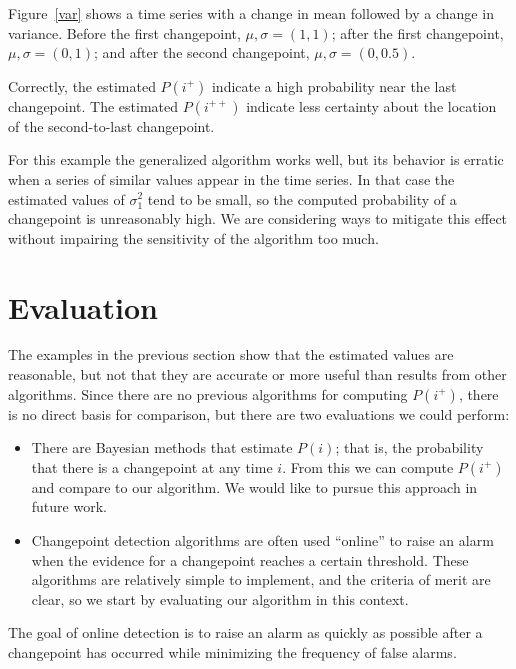 \documentclass[twocolumn,11pt]{article}
\begin{document}
Figure~\ref{var} shows a time series with a change in mean
followed by a change in variance.  Before the first changepoint, $\mu,
\sigma = (1, 1)$; after the first changepoint, $\mu, \sigma = (0, 1)$; and
after the second changepoint, $\mu, \sigma = (0, 0.5)$.

Correctly, the estimated $P(i^+)$ indicate a high probability
near the last changepoint.  The estimated $P(i^{++})$ indicate less
certainty about the location of the second-to-last changepoint.

For this example the generalized algorithm works well, but its
behavior is erratic when a series of similar values appear in the
time series.  In that case the estimated values of  $\sigma_1^2$ 
tend to be small, so the computed probability of a changepoint
is unreasonably high.  We are considering ways to mitigate this
effect without impairing the sensitivity of the algorithm
too much.


\section{Evaluation}
\label{evaluation}

The examples in the previous section show that the estimated
values are reasonable, but not that they are accurate or more
useful than results from other algorithms.  Since there are
no previous algorithms for computing $P(i^+)$, there is no
direct basis for comparison, but there are two
evaluations we could perform:

\begin{itemize}

\item There are Bayesian methods that estimate $P(i)$; that is,
the probability that there is a changepoint at any time $i$.
From this we can compute $P(i^+)$ and compare to our algorithm.
We would like to pursue this approach in future work.

\item Changepoint detection algorithms are often used ``online'' to
raise an alarm when the evidence for a changepoint reaches a certain
threshold.  These algorithms are relatively simple to implement, and
the criteria of merit are clear, so we start by evaluating our
algorithm in this context.

\end{itemize}

The goal of online detection is to raise an alarm as quickly
as possible after a changepoint has occurred while minimizing
the frequency of false alarms.
\end{document}
